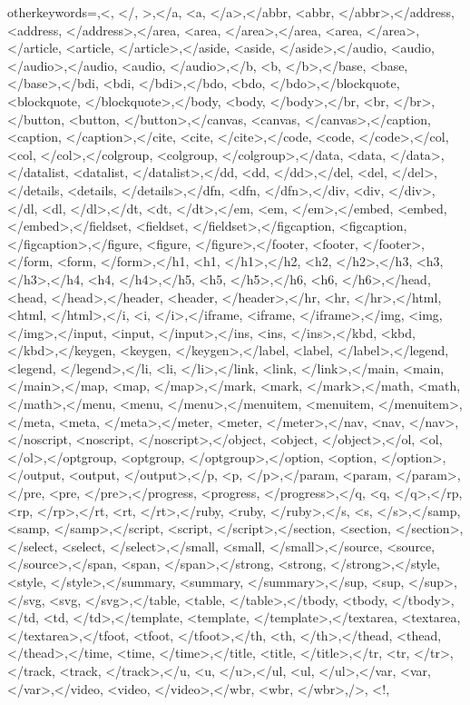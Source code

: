 {    %
    otherkeywords={\/,<, </, >,</a, <a, </a>,</abbr, <abbr, </abbr>,</address, <address, </address>,</area, <area, </area>,</area, <area, </area>,</article, <article, </article>,</aside, <aside, </aside>,</audio, <audio, </audio>,</audio, <audio, </audio>,</b, <b, </b>,</base, <base, </base>,</bdi, <bdi, </bdi>,</bdo, <bdo, </bdo>,</blockquote, <blockquote, </blockquote>,</body, <body, </body>,</br, <br, </br>,</button, <button, </button>,</canvas, <canvas, </canvas>,</caption, <caption, </caption>,</cite, <cite, </cite>,</code, <code, </code>,</col, <col, </col>,</colgroup, <colgroup, </colgroup>,</data, <data, </data>,</datalist, <datalist, </datalist>,</dd, <dd, </dd>,</del, <del, </del>,</details, <details, </details>,</dfn, <dfn, </dfn>,</div, <div, </div>,</dl, <dl, </dl>,</dt, <dt, </dt>,</em, <em, </em>,</embed, <embed, </embed>,</fieldset, <fieldset, </fieldset>,</figcaption, <figcaption, </figcaption>,</figure, <figure, </figure>,</footer, <footer, </footer>,</form, <form, </form>,</h1, <h1, </h1>,</h2, <h2, </h2>,</h3, <h3, </h3>,</h4, <h4, </h4>,</h5, <h5, </h5>,</h6, <h6, </h6>,</head, <head, </head>,</header, <header, </header>,</hr, <hr, </hr>,</html, <html, </html>,</i, <i, </i>,</iframe, <iframe, </iframe>,</img, <img, </img>,</input, <input, </input>,</ins, <ins, </ins>,</kbd, <kbd, </kbd>,</keygen, <keygen, </keygen>,</label, <label, </label>,</legend, <legend, </legend>,</li, <li, </li>,</link, <link, </link>,</main, <main, </main>,</map, <map, </map>,</mark, <mark, </mark>,</math, <math, </math>,</menu, <menu, </menu>,</menuitem, <menuitem, </menuitem>,</meta, <meta, </meta>,</meter, <meter, </meter>,</nav, <nav, </nav>,</noscript, <noscript, </noscript>,</object, <object, </object>,</ol, <ol, </ol>,</optgroup, <optgroup, </optgroup>,</option, <option, </option>,</output, <output, </output>,</p, <p, </p>,</param, <param, </param>,</pre, <pre, </pre>,</progress, <progress, </progress>,</q, <q, </q>,</rp, <rp, </rp>,</rt, <rt, </rt>,</ruby, <ruby, </ruby>,</s, <s, </s>,</samp, <samp, </samp>,</script, <script, </script>,</section, <section, </section>,</select, <select, </select>,</small, <small, </small>,</source, <source, </source>,</span, <span, </span>,</strong, <strong, </strong>,</style, <style, </style>,</summary, <summary, </summary>,</sup, <sup, </sup>,</svg, <svg, </svg>,</table, <table, </table>,</tbody, <tbody, </tbody>,</td, <td, </td>,</template, <template, </template>,</textarea, <textarea, </textarea>,</tfoot, <tfoot, </tfoot>,</th, <th, </th>,</thead, <thead, </thead>,</time, <time, </time>,</title, <title, </title>,</tr, <tr, </tr>,</track, <track, </track>,</u, <u, </u>,</ul, <ul, </ul>,</var, <var, </var>,</video, <video, </video>,</wbr, <wbr, </wbr>,/>, <!},   
}
